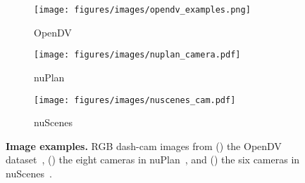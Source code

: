 





\begin{figure}[h]
\centering
\begin{subfigure}{0.3\linewidth} 
\texttt{[image: figures/images/opendv\_examples.png]}
  \caption{OpenDV~\cite{yang2024opendv}}
\hfill
\label{fig:opendv_examples}
\end{subfigure}
\centering
\begin{subfigure}{0.32\linewidth} 
\texttt{[image: figures/images/nuplan\_camera.pdf]}
  \caption{nuPlan~\cite{caesar2021nuplan}}
\hfill
\label{fig:nuplan_examples}
\end{subfigure}
\centering
\begin{subfigure}{0.32\linewidth}
\texttt{[image: figures/images/nuscenes\_cam.pdf]}     
  \caption{nuScenes~\cite{caesar2020nuscenes}}
  \hfill
\label{fig:nuscenes_examples}
\end{subfigure}
\caption{\textbf{Image examples.} RGB dash-cam images from () the OpenDV dataset~\cite{yang2024opendv}, () the eight cameras in nuPlan~\cite{caesar2021nuplan}, and () the six cameras in nuScenes~\cite{caesar2020nuscenes}.}
\label{fig:data_examples}
\end{figure}